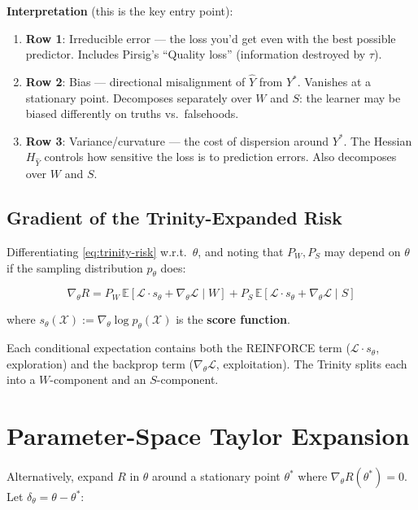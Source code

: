 \documentclass[11pt,a4paper]{article}
\newcommand{\E}{\mathbb{E}}
\newcommand{\calL}{\mathcal{L}}
\newcommand{\calX}{\mathcal{X}}
\begin{document}
\textbf{Interpretation} (this is the key entry point):
\begin{enumerate}[nosep]
\item \textbf{Row 1}: Irreducible error — the loss you'd get even with the best possible predictor. Includes Pirsig's ``Quality loss'' (information destroyed by $\tau$).
\item \textbf{Row 2}: Bias — directional misalignment of $\hat{Y}$ from $Y^*$. Vanishes at a stationary point. Decomposes separately over $W$ and $S$: the learner may be biased differently on truths vs.\ falsehoods.
\item \textbf{Row 3}: Variance/curvature — the cost of dispersion around $Y^*$. The Hessian $H_{\hat{Y}}$ controls how sensitive the loss is to prediction errors. Also decomposes over $W$ and $S$.
\end{enumerate}

\subsection{Gradient of the Trinity-Expanded Risk}

Differentiating \eqref{eq:trinity-risk} w.r.t.\ $\theta$, and noting that $P_W, P_S$ may depend on $\theta$ if the sampling distribution $p_\theta$ does:

\begin{equation}
\nabla_\theta R = P_W \, \E[\calL \cdot s_\theta + \nabla_\theta \calL \mid W] + P_S \, \E[\calL \cdot s_\theta + \nabla_\theta \calL \mid S]
\label{eq:trinity-grad}
\end{equation}

where $s_\theta(\calX) := \nabla_\theta \log p_\theta(\calX)$ is the \textbf{score function}.

Each conditional expectation contains both the REINFORCE term ($\calL \cdot s_\theta$, exploration) and the backprop term ($\nabla_\theta \calL$, exploitation). The Trinity splits each into a $W$-component and an $S$-component.


\newpage
\section{Parameter-Space Taylor Expansion}

Alternatively, expand $R$ in $\theta$ around a stationary point $\theta^*$ where $\nabla_\theta R(\theta^*) = 0$. Let $\delta_\theta = \theta - \theta^*$:
\end{document}
